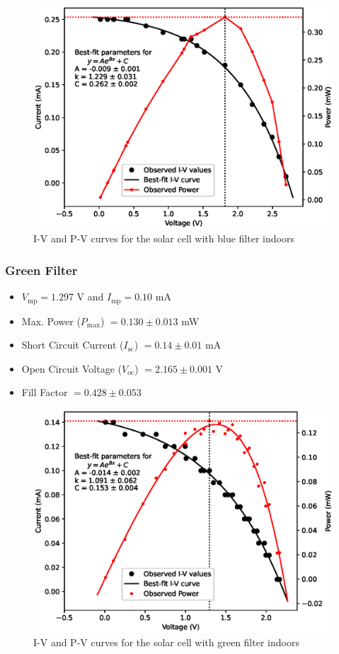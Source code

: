 \begin{figure}[H]
    \centering
    \includegraphics[width=1\columnwidth]{images/in/blue.eps}
    \caption{I-V and P-V curves for the solar cell with blue filter indoors}
\end{figure}


\subsubsection{Green Filter}
\begin{itemize}
    \item $V_\text{mp} = 1.297$ V and $I_\text{mp} = 0.10$ mA
    \item Max. Power ($P_\text{max}$) $= 0.130 \pm 0.013 $ mW
    \item Short Circuit Current ($I_\text{sc}$) $= 0.14 \pm 0.01$ mA
    \item Open Circuit Voltage ($V_\text{oc}$) $= 2.165 \pm 0.001$ V
    \item Fill Factor $= 0.428 \pm 0.053$
\end{itemize}

\begin{figure}[H]
    \centering
    \includegraphics[width=1\columnwidth]{images/in/green.eps}
    \caption{I-V and P-V curves for the solar cell with green filter indoors}
\end{figure}

